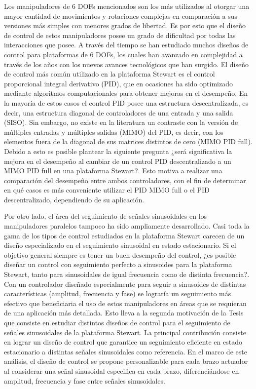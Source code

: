 Los manipuladores de $6$ DOFs mencionados son los más utilizados al otorgar una mayor cantidad de movimientos y rotaciones complejas en comparación a sus versiones más simples con menores grados de libertad. Es por esto que el diseño de control de estos manipuladores posee un grado de dificultad por todas las interacciones que posee. A través del tiempo se han estudiado muchos diseños de control para plataformas de $6$ DOFs, los cuales han avanzado en complejidad a través de los años con los nuevos avances tecnológicos que han surgido. El diseño de control más común utilizado en la plataforma Stewart es el control proporcional integral derivativo (PID), que en ocasiones ha sido optimizado mediante algoritmos computacionales para obtener mejoras en el desempeño. En la mayoría de estos casos el control PID posee una estructura descentralizada, es decir, una estructura diagonal de controladores de una entrada y una salida (SISO). Sin embargo, no existe en la literatura un contraste con la versión de múltiples entradas y múltiples salidas (MIMO) del PID, es decir, con los elementos fuera de la diagonal de sus matrices distintos de cero (MIMO PID full). Debido a esto es posible plantear la siguiente pregunta ¿será significativa la mejora en el desempeño al cambiar de un control PID descentralizado a un MIMO PID full en una plataforma Stewart?. Esto motiva a realizar una comparación del desempeño entre ambos controladores, con el fin de determinar en qué casos es más conveniente utilizar el PID MIMO full o el PID descentralizado, dependiendo de su aplicación.

Por otro lado, el área del seguimiento de señales sinusoidales en los manipuladores paralelos tampoco ha sido ampliamente desarrollado. Casi toda la gama de los tipos de control estudiados en la plataforma Stewart carecen de un diseño especializado en el seguimiento sinusoidal en estado estacionario. Si el objetivo general siempre es tener un buen desempeño del control, ¿es posible diseñar un control con seguimiento perfecto a sinusoides para la plataforma Stewart, tanto para sinusoidales de igual frecuencia como de distinta frecuencia?. Con un controlador diseñado especialmente para seguir a sinusoides de distintas características (amplitud, frecuencia y fase) se lograría un seguimiento más efectivo que beneficiaria el uso de estos manipuladores en áreas que se requieran de una aplicación más detallada. Esto lleva a la segunda motivación de la Tesis que consiste en estudiar distintos diseños de control para el seguimiento de señales sinusoidales de la plataforma Stewart. La principal contribución consiste en lograr un diseño de control que garantice un seguimiento eficiente en estado estacionario a distintas señales sinusoidales como referencia. En el marco de este análisis, el diseño de control se propone personalizable para cada brazo actuador al considerar una señal sinusoidal especifica en cada brazo, diferenciándose en amplitud, frecuencia y fase entre señales sinusoidales. 

